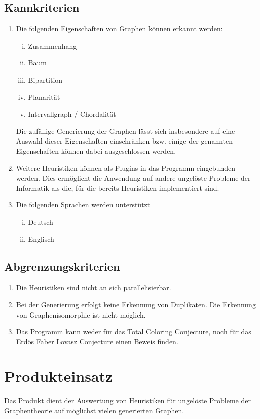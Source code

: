 \documentclass{article}
\begin{document}
	\subsection{Kannkriterien}
	\begin{enumerate}[(K1)]
		\item{Die folgenden Eigenschaften von Graphen können erkannt werden:
			\begin{enumerate}[i)]
				\item{Zusammenhang}
				\item{Baum}
				\item{Bipartition}
				\item{Planarität}
				\item{Intervallgraph / Chordalität}
			\end{enumerate}
			Die zufällige Generierung der Graphen lässt sich insbesondere auf eine Auswahl dieser Eigenschaften einschränken bzw. einige der genannten Eigenschaften können dabei ausgeschlossen werden.
		}
		\item{Weitere Heuristiken können als Plugins in das Programm eingebunden werden. Dies ermöglicht die Anwendung auf andere ungelöste Probleme der Informatik als die, für die bereits Heuristiken implementiert sind.}
		\item{Die folgenden Sprachen werden unterstützt
			\begin{enumerate}[i)]
				\item{Deutsch}
				\item{Englisch}
			\end{enumerate}
		}
	\end{enumerate}
	
	\subsection{Abgrenzungskriterien}
	\begin{enumerate}[(A1)]
		\item{Die Heuristiken sind nicht an sich parallelisierbar.}
		\item{Bei der Generierung erfolgt keine Erkennung von Duplikaten. Die Erkennung von Graphenisomorphie ist nicht möglich.}
		\item{Das Programm kann weder für das Total Coloring Conjecture, noch für das Erdös Faber Lovasz Conjecture einen Beweis finden.}
	\end{enumerate}
	
	
	
	
	\section{Produkteinsatz}
	Das Produkt dient der Auswertung von Heuristiken für ungelöste Probleme der Graphentheorie auf möglichst vielen generierten Graphen.
	
\end{document}
